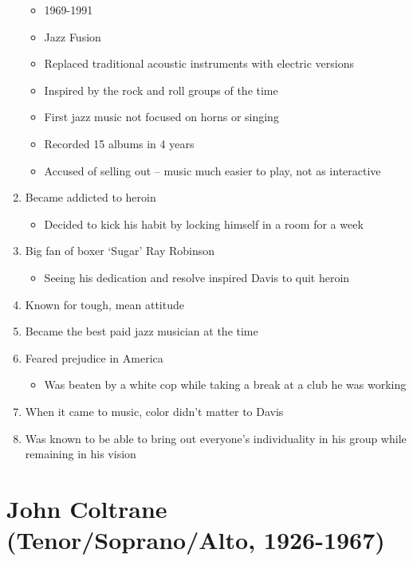 \documentclass[]{article}
\providecommand{\tightlist}{%
  \setlength{\itemsep}{0pt}\setlength{\parskip}{0pt}}
\begin{document}
\begin{enumerate}
  \begin{itemize}
  \tightlist
  \item
    1969-1991
  \item
    Jazz Fusion
  \item
    Replaced traditional acoustic instruments with electric versions
  \item
    Inspired by the rock and roll groups of the time
  \item
    First jazz music not focused on horns or singing
  \item
    Recorded 15 albums in 4 years
  \item
    Accused of selling out -- music much easier to play, not as
    interactive
  \end{itemize}
\item
  Became addicted to heroin

  \begin{itemize}
  \tightlist
  \item
    Decided to kick his habit by locking himself in a room for a week
  \end{itemize}
\item
  Big fan of boxer `Sugar' Ray Robinson

  \begin{itemize}
  \tightlist
  \item
    Seeing his dedication and resolve inspired Davis to quit heroin
  \end{itemize}
\item
  Known for tough, mean attitude
\item
  Became the best paid jazz musician at the time
\item
  Feared prejudice in America

  \begin{itemize}
  \tightlist
  \item
    Was beaten by a white cop while taking a break at a club he was
    working
  \end{itemize}
\item
  When it came to music, color didn't matter to Davis
\item
  Was known to be able to bring out everyone's individuality in his
  group while remaining in his vision
\end{enumerate}

\section{John Coltrane (Tenor/Soprano/Alto,
1926-1967)}\label{john-coltrane-tenorsopranoalto-1926-1967}
\end{document}
